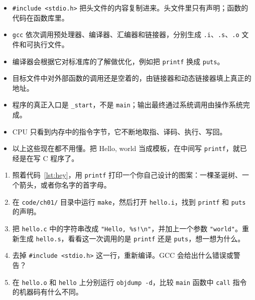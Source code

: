 \begin{itemize}
  \item \texttt{\#include <stdio.h>} 把头文件的内容复制进来。头文件里只有声明；函数的代码在函数库里。
  \item \texttt{gcc} 依次调用预处理器、编译器、汇编器和链接器，分别生成 \texttt{.i}、\texttt{.s}、\texttt{.o} 文件和可执行文件。
  \item 编译器会根据它对标准库的了解做优化，例如把 \texttt{printf} 换成 \texttt{puts}。
  \item 目标文件中对外部函数的调用还是空着的，由链接器和动态链接器填上真正的地址。
  \item 程序的真正入口是 \texttt{\_start}，不是 \texttt{main}；输出最终通过系统调用由操作系统完成。
  \item CPU 只看到内存中的指令字节，它不断地取指、译码、执行、写回。
  \item 以上这些现在都不用懂。把 Hello, world 当成模板，在中间写 \texttt{printf}，就已经是在写 C 程序了。
\end{itemize}


\begin{enumerate}
  \item 照着代码~\ref{lst:hey}，用 \texttt{printf} 打印一个你自己设计的图案：一棵圣诞树、一个箭头，或者你名字的首字母。
  \item 在 \texttt{code/ch01/} 目录中运行 \texttt{make}，然后打开 \texttt{hello.i}，找到 \texttt{printf} 和 \texttt{puts} 的声明。
  \item 把 \texttt{hello.c} 中的字符串改成 \texttt{"Hello, \%s!\textbackslash n"}，并加上一个参数 \texttt{"world"}。重新生成 \texttt{hello.s}，看看这一次调用的是 \texttt{printf} 还是 \texttt{puts}，想一想为什么。
  \item 去掉 \texttt{\#include <stdio.h>} 这一行，重新编译。GCC 会给出什么错误或警告？
  \item 在 \texttt{hello.o} 和 \texttt{hello} 上分别运行 \texttt{objdump -d}，比较 \texttt{main} 函数中 \texttt{call} 指令的机器码有什么不同。
\end{enumerate}
